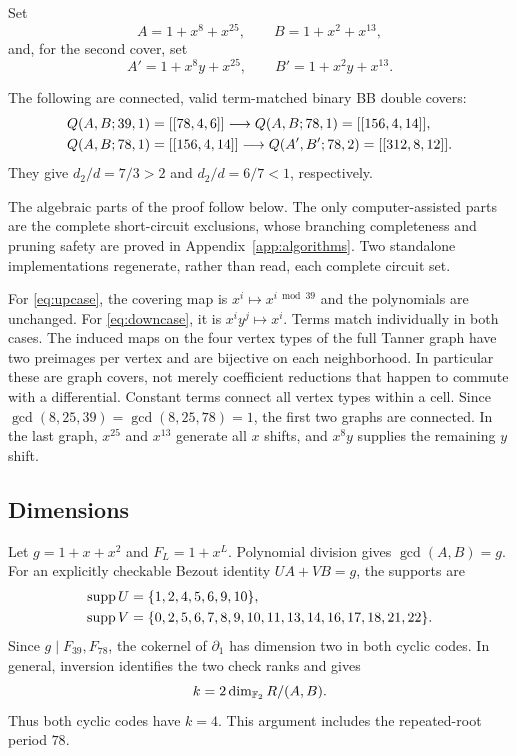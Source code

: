 Set
\begin{equation}\label{eq:AB}
 A=1+x^8+x^{25},\qquad B=1+x^2+x^{13},
\end{equation}
and, for the second cover, set
\begin{equation}\label{eq:ABtilde}
 A'=1+x^8y+x^{25},\qquad B'=1+x^2y+x^{13}.
\end{equation}
\begin{theorem}\label{thm:examples}
The following are connected, valid term-matched binary BB double covers:
\begin{align}
 Q(A,B;39,1)&=[[78,4,6]]
       \longrightarrow Q(A,B;78,1)=[[156,4,14]],\label{eq:upcase}\\
 Q(A,B;78,1)&=[[156,4,14]]
       \longrightarrow Q(A',B';78,2)=[[312,8,12]].\label{eq:downcase}
\end{align}
They give $d_2/d=7/3>2$ and $d_2/d=6/7<1$, respectively.
\end{theorem}
The algebraic parts of the proof follow below. The only computer-assisted parts are the complete short-circuit exclusions, whose branching completeness and pruning safety are proved in Appendix~\ref{app:algorithms}. Two standalone implementations regenerate, rather than read, each complete circuit set.

For \eqref{eq:upcase}, the covering map is $x^i\mapsto x^{i\bmod39}$ and the polynomials are unchanged. For \eqref{eq:downcase}, it is $x^iy^j\mapsto x^i$. Terms match individually in both cases. The induced maps on the four vertex types of the full Tanner graph have two preimages per vertex and are bijective on each neighborhood. In particular these are graph covers, not merely coefficient reductions that happen to commute with a differential. Constant terms connect all vertex types within a cell. Since $\gcd(8,25,39)=\gcd(8,25,78)=1$, the first two graphs are connected. In the last graph, $x^{25}$ and $x^{13}$ generate all $x$ shifts, and $x^8y$ supplies the remaining $y$ shift.

\subsection{Dimensions}
Let $g=1+x+x^2$ and $F_L=1+x^L$. Polynomial division gives $\gcd(A,B)=g$. For an explicitly checkable Bezout identity $UA+VB=g$, the supports are
\begin{align*}
 \operatorname{supp} U&=\{1,2,4,5,6,9,10\},\\
 \operatorname{supp} V&=\{0,2,5,6,7,8,9,10,11,13,14,16,17,18,21,22\}.
\end{align*}
Since $g\mid F_{39},F_{78}$, the cokernel of $\partial_1$ has dimension two in both cyclic codes. In general, inversion identifies the two check ranks and gives
\begin{equation}\label{eq:k-coker}
 k=2\dim_{\mathbb F_2}R/(A,B).
\end{equation}
Thus both cyclic codes have $k=4$. This argument includes the repeated-root period $78$.

